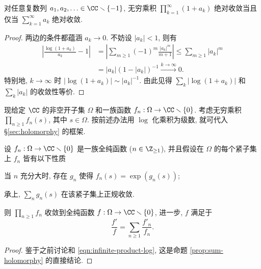 \begin{proposition}\label{prop:infinite-product-conv}
	对任意复数列 $a_1, a_2, \ldots \in \CC \smallsetminus \{-1\}$, 无穷乘积 $\prod_{k=1}^\infty (1 + a_k)$ 绝对收敛当且仅当 $\sum_{k=1}^\infty a_k$ 绝对收敛.
\end{proposition}
\begin{proof}
	两边的条件都蕴涵 $a_k \to 0$. 不妨设 $|a_k| < 1$, 则有
	\begin{align*}
		\left| \frac{\log(1 + a_k)}{a_k} - 1 \right| & = \left| \sum_{m \geq 1} (-1)^m \frac{|a_k|^m}{m+1} \right| \leq \sum_{m \geq 1} |a_k|^m \\
		& = |a_k| (1 - |a_k|)^{-1} \xrightarrow{k \to \infty} 0.
	\end{align*}
	特别地, $k \to \infty$ 时 $|\log(1 + a_k)| \sim |a_k|^{-1}$. 由此见得 $\sum_k \left| \log(1 + a_k) \right|$ 和 $\sum_k |a_k|$ 的收敛性等价.
\end{proof}

现给定 $\CC$ 的非空开子集 $\Omega$ 和一族函数 $f_n: \Omega \to \CC \smallsetminus \{0\}$. 考虑无穷乘积 $\prod_{n \geq 1} f_n(s)$, 其中 $s \in \Omega$. 按前述办法用 $\log$ 化乘积为级数, 就可代入 \S\ref{sec:holomorphy} 的框架.

\begin{proposition}\label{prop:infinite-product-holomorphy}
	设 $f_n: \Omega \to \CC \smallsetminus \{0\}$ 是一族全纯函数 ($n \in \Z_{\geq 1}$), 并且假设在 $\Omega$ 的每个紧子集上 $f_n$ 皆有以下性质
	\begin{compactitem}
		\item 当 $n$ 充分大时, 存在 $g_n$ 使得 $f_n(s) = \exp(g_n(s))$;
		\item 承上, $\sum_n g_n(s)$ 在该紧子集上正规收敛.
	\end{compactitem}
	则 $\prod_{n \geq 1} f_n$ 收敛到全纯函数 $f: \Omega \to \CC \smallsetminus \{0\}$, 进一步, $f$ 满足于
	\[ \frac{f'}{f} = \sum_{n \geq 1} \frac{f'_n}{f_n}. \]
\end{proposition}
\begin{proof}
	鉴于之前讨论和 \eqref{eqn:infinite-product-log}, 这是命题 \ref{prop:sum-holomorphy} 的直接结论.
\end{proof}


